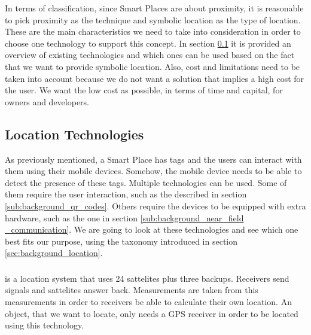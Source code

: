 In terms of classification, since Smart Places are about proximity, it is reasonable to pick proximity as the technique and symbolic location as the type of location.
These are the main characteristics we need to take into consideration in order to choose one technology to support this concept.
In section \ref{sec:background_technologies} it is provided an overview of existing technologies and which ones can be used based on the fact that we want to provide symbolic location.
Also, cost and limitations need to be taken into account because we do not want a solution that implies a high cost for the user.
We want the low cost as possible, in terms of time and capital, for owners and developers.

\subsection{Location Technologies}
\label{sec:background_technologies}
As previously mentioned, a Smart Place has tags and the users can interact with them using their mobile devices.
Somehow, the mobile device needs to be able to detect the presence of these tags.
Multiple technologies can be used.
Some of them require the user interaction, such as the described in section \ref{sub:background_qr_codes}.
Others require the devices to be equipped with extra hardware, such as the one in section \ref{sub:background_near_field _communication}.
We are going to look at these technologies and see which one best fits our purpose, using the taxonomy introduced in section \ref{sec:background_location}.

\subsubsection{}
\label{sub:background_gps}
 is a location system that uses 24 sattelites plus three backups.
Receivers send signals and sattelites answer back. Measurements are taken from this measurements in order to receivers be able to calculate their own location.
An object, that we want to locate, only needs a \gls{GPS} receiver in order to be located using this technology.

